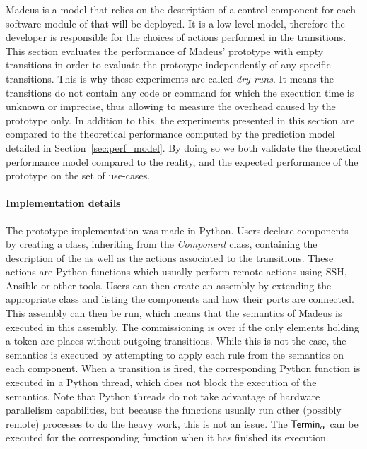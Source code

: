 
Madeus is a model that relies on the description of a control
component for each software module of that will be deployed. It is a
low-level model, therefore the developer is responsible for the
choices of actions performed in the transitions.  This section
evaluates the performance of Madeus' prototype with empty transitions
in order to evaluate the \mad prototype independently of any specific
transitions. This is why these experiments are called
\emph{dry-runs}. It means the transitions do not contain any code or
command for which the execution time is unknown or imprecise, thus
allowing to measure the overhead caused by the prototype only. In
addition to this, the experiments presented in this section are
compared to the theoretical performance computed by the prediction
model detailed in Section~\ref{sec:perf_model}. By doing so we both
validate the theoretical performance model compared to the reality,
and the expected performance of the prototype on the set of use-cases.

\paragraph{Implementation details}
The prototype implementation was made in Python. Users declare components
by creating a class, inheriting from the \emph{Component} class, containing
the description of the \net as well as the actions associated to the
transitions. These actions are Python functions which usually perform remote
actions using SSH, Ansible or other tools. Users can then create an assembly
by extending the appropriate class and listing the components and how their
ports are connected. This assembly can then be run, which means that the
semantics of Madeus is executed in this assembly. The commissioning is
over if the only elements holding a token are places
without outgoing transitions. While this is not the case, the semantics is
executed by attempting to apply each rule from the semantics on each component.
When a transition is fired, the corresponding Python function is executed in
a Python thread, which does not block the execution of the semantics. Note
that Python threads do not take advantage of hardware parallelism capabilities,
but because the functions usually run other (possibly remote) processes to
do the heavy work, this is not an issue. The $\mathsf{Termin}_\alpha$ can be executed
for the corresponding function when it has finished its execution.

